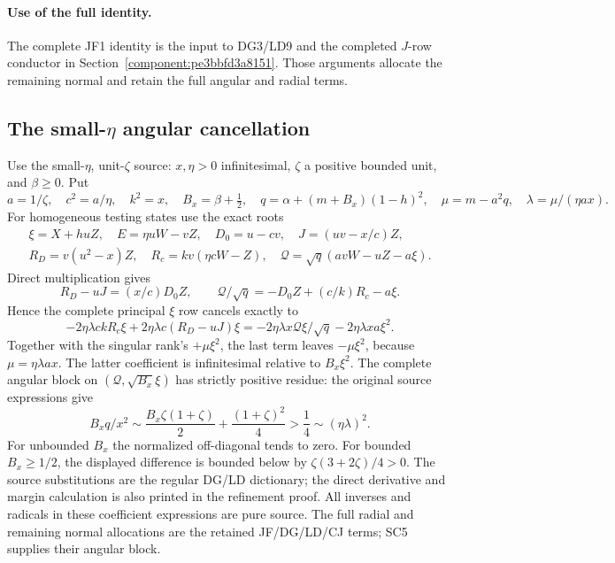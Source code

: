 \paragraph{Use of the full identity.}
The complete JF1 identity is the input to DG3/LD9 and the completed $J$-row conductor in Section~\ref{component:pe3bbfd3a8151}. Those arguments allocate the remaining normal and retain the full angular and radial terms.



\subsection{The small-$\eta$ angular cancellation}

\label{component:peea9e9c546c5}

Use the small-$\eta$, unit-$\zeta$ source: $x,\eta>0$
infinitesimal, $\zeta$ a positive bounded unit, and
$\beta\ge0$.  Put
\[
 a=1/\zeta,\quad c^2=a/\eta,\quad k^2=x,\quad
 B_x=\beta+\tfrac12,\quad q=\alpha+(m+B_x)(1-h)^2,
 \quad\mu=m-a^2q,\quad\lambda=\mu/(\eta ax).
\]
For homogeneous testing states use the exact roots
\[
\begin{gathered}
 \xi=X+huZ,\quad E=\eta uW-vZ,\quad
 D_0=u-cv,\quad J=(uv-x/c)Z,\\
 R_D=v(u^2-x)Z,\quad R_c=kv(\eta cW-Z),\quad
 \mathcal Q=\sqrt q(avW-uZ-a\xi).
\end{gathered}
\]
Direct multiplication gives
\[
 R_D-uJ=(x/c)D_0Z,\qquad
 \mathcal Q/\sqrt q=-D_0Z+(c/k)R_c-a\xi.
\]
Hence the complete principal $\xi$ row cancels exactly to
\[
 -2\eta\lambda ckR_c\xi+2\eta\lambda c(R_D-uJ)\xi
 =-2\eta\lambda x\mathcal Q\xi/\sqrt q
                    -2\eta\lambda xa\xi^2.             \tag{SC5}
\]
Together with the singular rank's $+\mu\xi^2$, the last term
leaves $-\mu\xi^2$, because $\mu=\eta\lambda ax$.
The latter coefficient is infinitesimal relative to $B_x\xi^2$.
The complete angular block on $(\mathcal Q,\sqrt{B_x}\xi)$
has strictly positive residue: the original source expressions give
\[
 B_xq/x^2\sim
 \frac{B_x\zeta(1+\zeta)}2+\frac{(1+\zeta)^2}4
       >\frac14\sim(\eta\lambda)^2.
\]
For unbounded $B_x$ the normalized off-diagonal tends to zero.
For bounded $B_x\ge1/2$, the displayed difference is bounded
below by $\zeta(3+2\zeta)/4>0$.  The source substitutions are
the regular DG/LD dictionary; the direct derivative and margin
calculation is also printed in the refinement proof.
All inverses and radicals in these coefficient expressions are
pure source.  The full radial and remaining normal allocations are
the retained JF/DG/LD/CJ terms; SC5 supplies their angular block.



